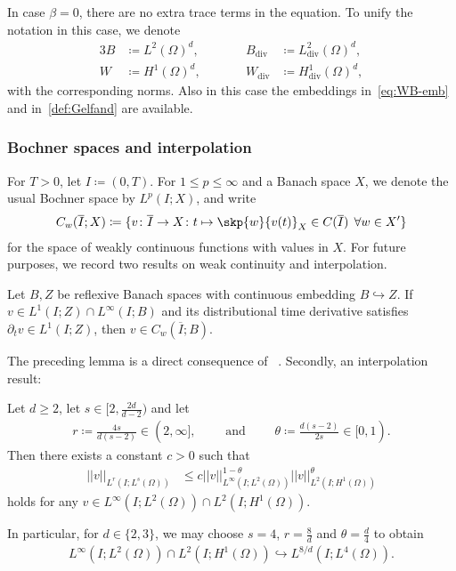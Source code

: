 \documentclass[reqno,a4paper]{amsart}
\def\norm#1{\left|\!\left| #1 \right|\!\right|}
\def\diver{\mathop{\mathrm{div}}\nolimits} %
\begin{document}
In case $\beta = 0$, there are no extra trace terms in the equation. 
To unify the notation in this case,  we denote 
\begin{alignat}{3}\label{def:sp-B-v}
	B &\coloneqq L^2(\Omega)^d, \qquad &&B_{\diver} &\coloneqq L^2_{\diver}(\Omega)^d,
	\\ \label{def:sp-W-v}
	W &\coloneqq H^1(\Omega)^d, \qquad &&W_{\diver} &\coloneqq H^{1}_{\diver}(\Omega)^d,
\end{alignat}
with the corresponding norms. 
Also in this case the embeddings in~\eqref{eq:WB-emb} and in~\eqref{def:Gelfand} are available. 

\subsubsection{Bochner spaces and interpolation}\label{sec:prel-bochner} 

For $T>0$, let $I \coloneqq (0,T)$. 
For $1\leq p \leq \infty$ and a Banach space $X$, we denote the usual Bochner space by $L^p(I;X)$, and write
\begin{align}
	C_w(\overline I;X) \coloneqq \{ v \colon \overline I \to X \colon t \mapsto \skp{w}{v(t)}_{X} \in C(\overline I) \,\; \forall w \in X' \}
\end{align}
for the space of weakly continuous functions with values in $X$. 
For future purposes, we record two results on weak continuity and interpolation.  
\begin{lemma}\label{lem:w-cont}
	Let $B,Z$ be reflexive Banach spaces with continuous embedding $B \hookrightarrow Z$. 
	If $v \in L^1(I;Z) \cap L^{\infty}(I;B)$ and its distributional time derivative satisfies $\partial_t v \in L^1(I;Z)$, then  $v \in C_{w}(\overline{I};B)$. 
\end{lemma}
The preceding lemma is a direct consequence of ~\cite[Lem.~1.1, Lem.~1.4, Ch.~III, \S 1]{Temam1984}. Secondly, an interpolation result: 
\begin{lemma}\label{lem:interp}	
	Let $d\geq 2$,  let $s \in [2, \frac{2d}{d-2})$ and let 
	\begin{align*}
		r\coloneqq  \frac{4s}{d(s-2)} \in (2, \infty], 
		\qquad \text{ and } \qquad 
		\theta \coloneqq  \frac{d(s-2)}{2s} \in [0,1).
	\end{align*}
	Then there exists a constant $c>0$ such that 
	\begin{align*}
		\norm{v}_{L^{r}(I;L^s(\Omega))} &\leq c \norm{v}_{L^{\infty}(I;L^{2}(\Omega))}^{1-\theta} \norm{v}_{L^2(I;H^1(\Omega))}^{\theta}
	\end{align*}
	holds for any $v \in L^{\infty}(I;L^2(\Omega))\cap L^2(I;H^1(\Omega))$. 
\end{lemma}
%
In particular, for $d \in \{2,3\}$, we may choose $s = 4$, $r = \frac{8}{d}$ and $\theta = \frac{d}{4}$ to obtain 
\begin{align}\label{est:interp}
	L^\infty(I;L^2(\Omega)) \cap L^2(I;H^1(\Omega)) \hookrightarrow L^{8/d}(I;L^4(\Omega)). 
\end{align}
\end{document}
